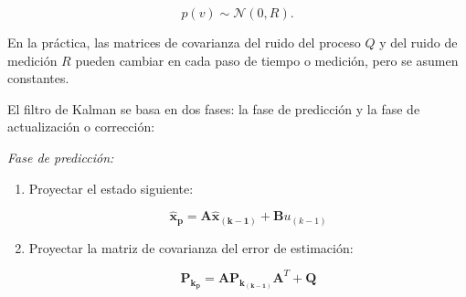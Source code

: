 \vspace{-0.5cm}
\begin{equation}
    p(v) \sim \mathcal{N}(0, R).
\end{equation}
\vspace{-0.5cm}

En la práctica, las matrices de covarianza del ruido del proceso \( Q \) y del ruido de medición \( R \) pueden cambiar en cada paso de tiempo
o medición, pero se asumen constantes. \parencite{WELCH}

El filtro de Kalman se basa en dos fases: la fase de predicción y la fase de actualización o corrección:

\textit{Fase de predicción:}
\begin{enumerate}
    \item Proyectar el estado siguiente:
    
    \vspace{-0.5cm}
    \begin{equation}
        \mathbf{\hat{x}_p} = \textbf{A} \mathbf{\hat{x}_{(k-1)}} + \textbf{B} u_{(k-1)}
    \end{equation}
    \vspace{-0.5cm}

    \item Proyectar la matriz de covarianza del error de estimación:
    
    \vspace{-0.5cm}
    \begin{equation}
        \mathbf{P_{k_p}} = \textbf{A} \mathbf{P_{k_{(k-1)}}} \textbf{A}^T + \textbf{Q}
    \end{equation}
    \vspace{-0.5cm}

\end{enumerate}

